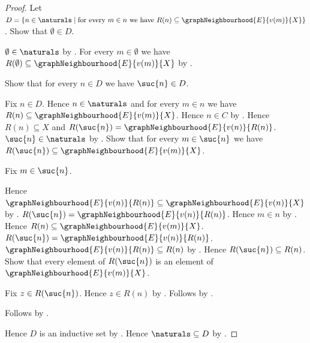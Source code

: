\begin{proof}
    Let $D=\{n\in\naturals\mid
        \text{for every $m\in n$ we have
            $R(n)\subseteq\graphNeighbourhood{E}{v(m)}{X}$}\}$.
    Show that $\emptyset\in D$.
    \begin{subproof}
        $\emptyset\in\naturals$ by .
        For every $m\in\emptyset$ we have
            $R(\emptyset)\subseteq\graphNeighbourhood{E}{v(m)}{X}$ by
            .
    \end{subproof}
    Show that for every $n\in D$ we have $\suc{n}\in D$.
    \begin{subproof}
        Fix $n\in D$.
        Hence $n\in\naturals$ and for every $m\in n$ we have
            $R(n)\subseteq\graphNeighbourhood{E}{v(m)}{X}$.
        Hence $n\in C$ by .
        Hence $R(n)\subseteq X$ and
            $R(\suc{n})=\graphNeighbourhood{E}{v(n)}{R(n)}$.
        $\suc{n}\in\naturals$ by .
        Show that for every $m\in\suc{n}$ we have
            $R(\suc{n})\subseteq\graphNeighbourhood{E}{v(m)}{X}$.
        \begin{subproof}
            Fix $m\in\suc{n}$.
            \begin{byCase}
                    Hence $\graphNeighbourhood{E}{v(n)}{R(n)}
                        \subseteq\graphNeighbourhood{E}{v(n)}{X}$ by
                        .
                    $R(\suc{n})=
                        \graphNeighbourhood{E}{v(n)}{R(n)}$.
                    Hence $m\in n$ by .
                    Hence $R(n)\subseteq
                        \graphNeighbourhood{E}{v(m)}{X}$.
                    $R(\suc{n})=
                        \graphNeighbourhood{E}{v(n)}{R(n)}$.
                    $\graphNeighbourhood{E}{v(n)}{R(n)}\subseteq R(n)$ by
                        .
                    Hence $R(\suc{n})\subseteq R(n)$.
                    Show that every element of $R(\suc{n})$ is an element of
                        $\graphNeighbourhood{E}{v(m)}{X}$.
                    \begin{subproof}
                        Fix $z\in R(\suc{n})$.
                        Hence $z\in R(n)$ by .
                        Follows by .
                    \end{subproof}
                    Follows by .
            \end{byCase}
        \end{subproof}
    \end{subproof}
    Hence $D$ is an inductive set by .
    Hence $\naturals\subseteq D$ by .


\end{proof}
